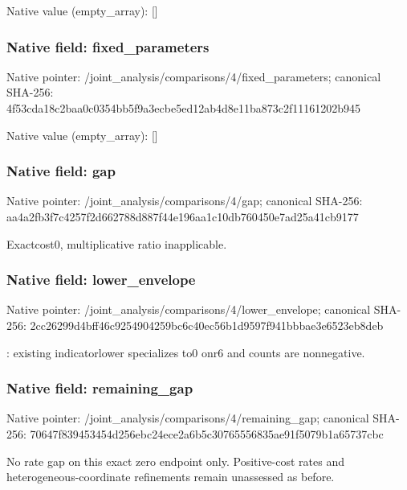 \documentclass[10pt,a4paper]{article}
\begin{document}
Native value (empty\_\allowbreak{}array): []

\subsubsection{Native field: fixed\_\allowbreak{}parameters}
Native pointer: /joint\_\allowbreak{}analysis/comparisons/4/fixed\_\allowbreak{}parameters; canonical SHA-256: 4f53cda18c2baa0c0354bb5f9a3ecbe5ed12ab4d8e11ba873c2f11161202b945

Native value (empty\_\allowbreak{}array): []

\subsubsection{Native field: gap}
Native pointer: /joint\_\allowbreak{}analysis/comparisons/4/gap; canonical SHA-256: aa4a2fb3f7c4257f2d662788d887f44e196aa1c10db760450e7ad25a41cb9177

\begingroup\raggedright\sloppy Exactcost0,\allowbreak{} multiplicative ratio inapplicable.\par\endgroup

\subsubsection{Native field: lower\_\allowbreak{}envelope}
Native pointer: /joint\_\allowbreak{}analysis/comparisons/4/lower\_\allowbreak{}envelope; canonical SHA-256: 2cc26299d4bff46c9254904259bc6c40ec56b1d9597f941bbbae3e6523eb8deb

\begingroup\raggedright{}:\allowbreak{} existing indicatorlower specializes to0 onr6 and counts are nonnegative.\par\endgroup

\subsubsection{Native field: remaining\_\allowbreak{}gap}
Native pointer: /joint\_\allowbreak{}analysis/comparisons/4/remaining\_\allowbreak{}gap; canonical SHA-256: 70647f839453454d256ebc24ece2a6b5c30765556835ae91f5079b1a65737cbc

\begingroup\raggedright\sloppy No rate gap on this exact zero endpoint only. Positive-cost rates and heterogeneous-coordinate refinements remain unassessed as before.\par\endgroup
\end{document}
